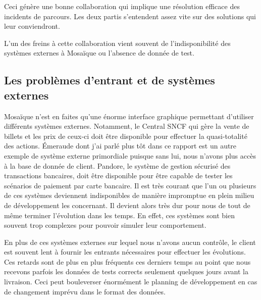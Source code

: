     Ceci génère une bonne collaboration qui implique une résolution efficace des incidents de parcours. Les deux partis s'entendent assez vite sur des solutions qui leur conviendront.
    
    L'un des freins à cette collaboration vient souvent de l'indisponibilité des systèmes externes à Mosaïque ou l'absence de donnée de test.
    
\subsection{Les problèmes d'entrant et de systèmes externes}

    Mosaïque n'est en faites qu'une énorme interface graphique permettant d'utiliser différents systèmes externes. Notamment, le Central SNCF qui gère la vente de billets et les prix de ceux-ci doit être disponible pour effectuer la quasi-totalité des actions. Émeraude dont j'ai parlé plus tôt dans ce rapport est un autre exemple de système externe primordiale puisque sans lui, nous n'avons plus accès à la base de donnée de client. Pandore, le système de gestion sécurisé des transactions bancaires, doit être disponible pour être capable de tester les scénarios de paiement par carte bancaire. Il est très courant que l'un ou plusieurs de ces systèmes deviennent indisponibles de manière impromptue en plein milieu de développement les concernant. Il devient alors très dur pour nous de tout de même terminer l'évolution dans les temps. En effet, ces systèmes sont bien souvent trop complexes pour pouvoir simuler leur comportement.
    
    En plus de ces systèmes externes sur lequel nous n'avons aucun contrôle, le client est souvent lent à fournir les entrants nécessaires pour effectuer les évolutions. Ces retards sont de plus en plus fréquents ces derniers temps au point que nous recevons parfois les données de tests corrects seulement quelques jours avant la livraison. Ceci peut bouleverser énormément le planning de développement en cas de changement imprévu dans le format des données.
